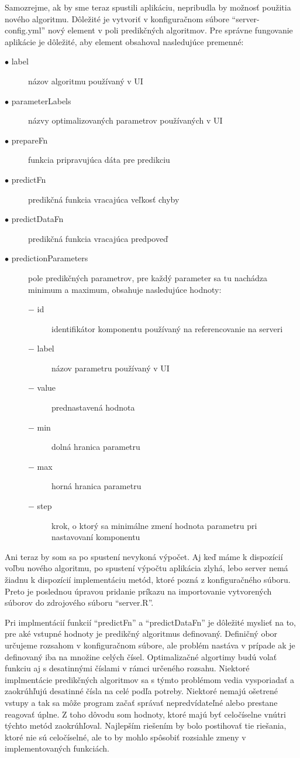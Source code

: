 \documentclass[a4paper,slovak,12pt,appendix]{article}
\begin{document}
Samozrejme, ak by sme teraz spustili aplikáciu, nepribudla by možnosť použitia
nového algoritmu. Dôležité je vytvoriť v konfiguračnom súbore
``server-config.yml'' nový element v poli predikčných algoritmov. Pre správne
fungovanie aplikácie je dôležité, aby element obsahoval nasledujúce premenné:
\begin{description}
  \item[$\bullet$ label] názov algoritmu používaný v UI
  \item[$\bullet$ parameterLabels] názvy optimalizovaných parametrov používaných v UI
  \item[$\bullet$ prepareFn] funkcia pripravujúca dáta pre predikciu
  \item[$\bullet$ predictFn] predikčná funkcia vracajúca veľkosť chyby
  \item[$\bullet$ predictDataFn] predikčná funkcia vracajúca predpoveď
  \item[$\bullet$ predictionParameters] pole predikčných parametrov, pre každý parameter sa
  tu nachádza minimum a maximum, obsahuje nasledujúce hodnoty:
  \begin{description}
    \item[$-$ id] identifikátor komponentu používaný na referencovanie na serveri
    \item[$-$ label] názov parametru používaný v UI
    \item[$-$ value] prednastavená hodnota
    \item[$-$ min] dolná hranica parametru
    \item[$-$ max] horná hranica parametru
    \item[$-$ step] krok, o ktorý sa minimálne zmení hodnota parametru pri nastavovaní komponentu
  \end{description}
\end{description}

Ani teraz by som sa po spustení nevykoná výpočet. Aj keď máme k dispozícií voľbu
nového algoritmu, po spustení výpočtu aplikácia zlyhá, lebo server nemá žiadnu
k dispozícií implementáciu metód, ktoré pozná z konfiguračného súboru. Preto je
poslednou úpravou pridanie príkazu na importovanie vytvorených súborov do
zdrojového súboru ``server.R''.

Pri implmentácií funkcií ``predictFn'' a ``predictDataFn'' je dôležité myslieť
na to, pre aké vstupné hodnoty je predikčný algoritmus definovaný. Definičný
obor určujeme rozsahom v konfiguračnom súbore, ale problém nastáva v prípade
ak je definovaný iba na množine celých čísel. Optimalizačné algortimy budú
volať funkciu aj s desatinnými číslami v rámci určeného rozsahu. Niektoré
implmentácie predikčných algoritmov sa s týmto problémom vedia vysporiadať
a zaokrúhľujú desatinné čísla na celé podľa potreby. Niektoré nemajú ošetrené
vstupy a tak sa môže program začať správať nepredvídateľné alebo prestane
reagovať úplne. Z toho dôvodu som hodnoty, ktoré majú byť celočíselne vnútri
týchto metód zaokrúhľoval. Najlepším riešením by bolo postihovať tie riešania,
ktoré nie sú celočíselné, ale to by mohlo spôsobiť rozsiahle zmeny v
implementovaných funkciách.
\end{document}
